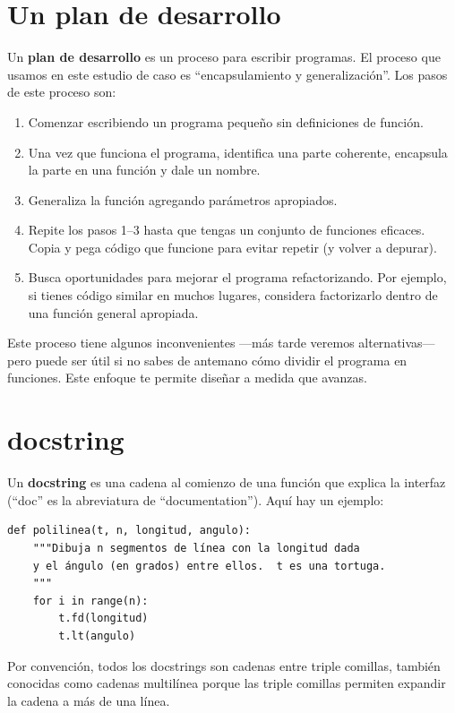 \documentclass[10pt]{book}
\begin{document}
\section{Un plan de desarrollo}

Un {\bf plan de desarrollo} es un proceso para escribir programas.  El
proceso que usamos en este estudio de caso es ``encapsulamiento y
generalización''.  Los pasos de este proceso son:

\begin{enumerate}

\item Comenzar escribiendo un programa pequeño sin definiciones de función.

\item Una vez que funciona el programa, identifica una parte
  coherente, encapsula la parte en una función y dale un nombre.

\item Generaliza la función agregando parámetros apropiados.

\item Repite los pasos 1--3 hasta que tengas un conjunto de funciones eficaces.
Copia y pega código que funcione para evitar repetir (y volver a depurar).

\item Busca oportunidades para mejorar el programa refactorizando.
Por ejemplo, si tienes código similar en muchos lugares, considera
factorizarlo dentro de una función general apropiada.

\end{enumerate}

Este proceso tiene algunos inconvenientes ---más tarde veremos alternativas--- pero
puede ser útil si no sabes de antemano cómo dividir el
programa en funciones.  Este enfoque te permite diseñar a medida que
avanzas.


\section{docstring}
\label{docstring}

Un {\bf docstring} es una cadena al comienzo de una función que
explica la interfaz (``doc'' es la abreviatura de ``documentation'').  Aquí
hay un ejemplo:

\begin{verbatim}
def polilinea(t, n, longitud, angulo):
    """Dibuja n segmentos de línea con la longitud dada
    y el ángulo (en grados) entre ellos.  t es una tortuga.
    """
    for i in range(n):
        t.fd(longitud)
        t.lt(angulo)
\end{verbatim}
%
Por convención, todos los docstrings son cadenas entre triple comillas, también conocidas
como cadenas multilínea porque las triple comillas permiten expandir
la cadena a más de una línea.
\end{document}
